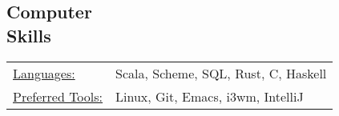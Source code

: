 \documentclass[margin]{res}
\begin{document}
\begin{resume}
\section{Computer \\ Skills}
   \begin{tabular}{l p{3in}}
    \underline{Languages:} & Scala, Scheme, SQL, Rust, C, Haskell \\
    \underline{Preferred Tools:} & Linux, Git, Emacs, i3wm, IntelliJ
   \end{tabular}

\end{resume} 
\end{document}
